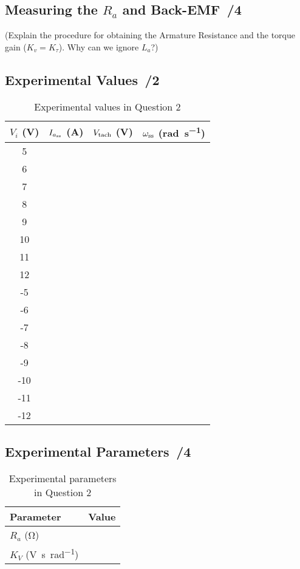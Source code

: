 \documentclass{article}
\newcommand{\score}{\hfill \underline{\hspace{0.65cm}}\,/} %
\begin{document}
\subsection{Measuring the $R_a$ and Back-EMF \score 4}
(Explain the procedure for obtaining the Armature Resistance and the torque gain ($K_v = K_{\tau}$). Why can we ignore $L_a$?)

\subsection{Experimental Values \score 2}
\begin{table}[phtb] \label{tbl:lab4_q2_1}
\begin{center}
\caption{Experimental values in Question 2}
\begin{tabular}{c|r|r|r} \hline \hline
\cellcolor{lightgray} $V_i$ (\si{\volt}) & \cellcolor{lightgray} $I_{a_{\rm ss}}$ (\si{\ampere}) & \cellcolor{lightgray} $V_{\rm tach}$ (\si{\volt}) & \cellcolor{lightgray} $\omega_{\rm ss}$ (\si{\radian\per\second}) \\
\hline
5 &   &   &   \\ \hline
6 &   &   &   \\ \hline
7 &   &   &  \\ \hline
8 &   &   &  \\ \hline
9 &   &   &  \\ \hline
10  &   &   &  \\ \hline
11  &   &   &  \\ \hline
12  &   &   &  \\ \hline
-5  &   &   &  \\ \hline
-6  &  &  &  \\ \hline
-7  &  &  &   \\ \hline
-8  &  &  &   \\ \hline
-9  &  &  &   \\ \hline
-10 &  &  &   \\ \hline
-11 &  &  &   \\ \hline
-12 &  &  & \\ \hline
\end{tabular}
\end{center}
\end{table}

\subsection{Experimental Parameters \score 4}
\begin{table}[phtb] \label{tbl:lab4_q2_2}
\begin{center}
\caption{Experimental parameters in Question 2}
\begin{tabular}{l|r} \hline \hline
\cellcolor{lightgray} Parameter & \cellcolor{lightgray} Value \\
\hline
$R_a$ (\si{\ohm}) &  \\ \hline
$K_V$ (\si{\volt\second\per\radian}) &  \\ \hline
\end{tabular}
\end{center}
\end{table}
\end{document}
